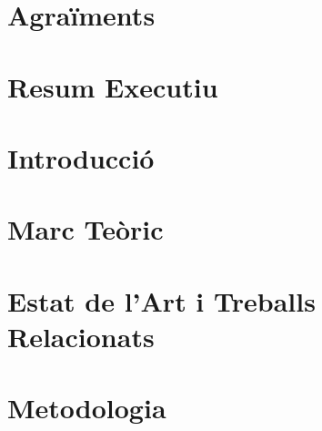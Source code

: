 \documentclass[a4paper,11pt]{book}
\begin{document}

\thispagestyle{empty}

\frontmatter

\chapter*{Agraïments}


\chapter*{Resum Executiu}


\tableofcontents
\listoffigures
\listoftables

\mainmatter

\chapter{Introducció}
\label{ch:introduction}


\chapter{Marc Teòric} 
\label{ch:background}


\chapter{Estat de l'Art i Treballs Relacionats}
\label{ch:state-of-the-art}


\chapter{Metodologia}
\label{ch:methodology}

\end{document}

